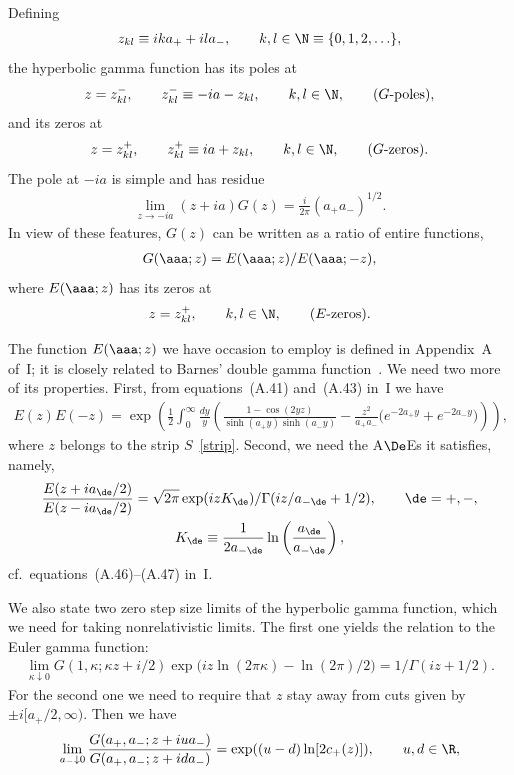 Def\/ining
\begin{gather}\label{zkl}
z_{kl}\equiv ika_{+}+ila_{-},\qquad k,l\in\N\equiv \{ 0,1,2,\ldots\},
\end{gather}
the hyperbolic gamma function has its poles at
\begin{gather}\label{Gpo}
z=z_{kl}^-,\qquad z_{kl}^-\equiv -ia -z_{kl},\qquad k,l\in\N,\qquad (G\mbox{-poles}),
\end{gather}
and its zeros at
\begin{gather}\label{Gze}
z=z_{kl}^+,\qquad z_{kl}^+\equiv ia +z_{kl},\qquad k,l\in\N,\qquad (G\mbox{-zeros}).
\end{gather}
The pole at $-ia$ is simple and has residue
\begin{gather}\label{Gres}
\lim_{z\to -ia}(z+ia)G(z)=\frac{i}{2\pi}(a_{+}a_{-})^{1/2}.
\end{gather}
In view of these features, $G(z)$ can be written as a ratio of entire functions,
\begin{gather}\label{GE}
G(\aaa;z)=E(\aaa;z)/E(\aaa;-z),
\end{gather}
where $E(\aaa;z)$ has its zeros at
\begin{gather}\label{Eze}
z=z^{+}_{kl},\qquad k,l\in\N,\qquad (E\mbox{-zeros}).
\end{gather}

The function $E(\aaa;z)$ we have occasion to employ is def\/ined in Appendix~A of~I; it is closely related to Barnes' double gamma function~\cite{barn}. We need two more of its properties. First, from equations~(A.41) and~(A.43) in~I we have
 \begin{gather}\label{EwT}
 E(z)E(-z)=\exp\left(\frac12\int_0^{\infty}\!\frac{dy}{y}\left(
 \frac{1-\cos(2yz)}{\sinh(a_{+}y)\sinh(a_{-}y)}-\frac{z^2}{a_+a_-}\big(e^{-2a_{+}y}+e^{-2a_{-}y}\big)\right)\right),\!\!\!
 \end{gather}
where $z$ belongs to the strip $S$~\eqref{strip}. Second, we need the A$\De$Es it satisf\/ies, namely,
\begin{gather}\label{Eades}
\frac{E(z+ia_{\de}/2)}{E(z-ia_{\de}/2)}=\sqrt{2\pi}\exp(izK_{\de})/\Gamma(iz/a_{-\de}+1/2),\qquad \de=+,-,
\\
K_{\de}\equiv \frac{1}{2a_{-\de}}\ln \left( \frac{a_{\de}}{a_{-\de}}\right),
\end{gather}
cf.~equations~(A.46)--(A.47) in~I.

We also state two zero step size limits of the hyperbolic gamma function, which we need for taking nonrelativistic limits. The f\/irst one yields the relation to the Euler gamma function:
\begin{gather}\label{GhGr}
\lim_{\kappa\downarrow 0}G(1,\kappa;
 \kappa z+i/2)\exp \big(iz\ln(2\pi\kappa)-\ln(2\pi)/2\big) = 1/\Gamma(iz+1/2).
\end{gather}
For the second one we need to require that $z$ stay away from  cuts given by $\pm i[a_+/2,\infty)$. Then we have
\begin{gather}\label{Gnr}
\lim_{a_{-}\downarrow 0}\frac{G(a_+, a_{-};z+iua_{-})}{G(a_+, a_{-};z+ida_{-})}
=\exp((u-d)\ln [2c_+(z)]),\qquad u,d\in\R,
\end{gather}
